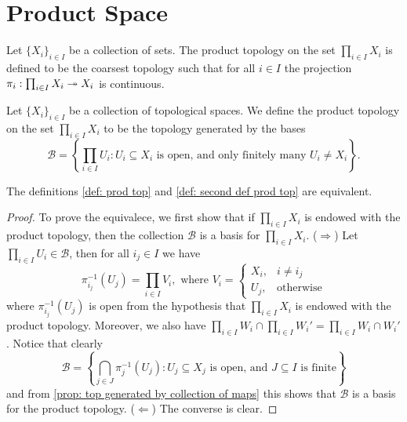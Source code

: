 \section{Product Space}

\begin{definition}
  \label{def: prod top}
  Let \(\{X_i\}_{i \in I}\) be a collection of sets. The product topology on the
  set \(\prod_{i \in I} X_i\) is defined to be the coarsest topology such that
  for all \(i \in I\) the projection \(\pi_i : \prod_{i \in I} X_i \twoheadrightarrow X_i\) is
  continuous.
\end{definition}

\begin{definition}
  \label{def: second def prod top}
  Let \(\{X_i\}_{i \in I}\) be a collection of topological spaces. We
  define the product topology on the set \(\prod_{i \in I} X_i\) to be the
  topology generated by the bases
  \[
    \mathcal B = \left\{ \prod_{i \in I} U_i : U_i \subseteq X_i
    \text{ is open, and only finitely many } U_i \neq X_i \right\}.
  \]
\end{definition}

\begin{corollary}\label{cor: equivalent defs prod top}
  The definitions \ref{def: prod top} and \ref{def: second def prod top}
  are equivalent.
\end{corollary}

\begin{proof}
  To prove the equivalece, we first show that if \(\prod_{i \in I} X_i\) is
  endowed with the product topology, then the collection \(\mathcal B\) is a
  basis for \(\prod_{i \in I} X_i\). (\(\Rightarrow\)) Let \(\prod_{i \in I} U_i
  \in \mathcal B\), then for all \(i_j \in I\) we have
  \[
    \pi_{i_j}^{-1}(U_j) = \prod_{i \in I} V_i, \text{ where } V_i =
    \begin{cases}
      X_i, &i \neq i_j \\
      U_j, &\text{otherwise}
    \end{cases}
  \]
  where \(\pi_{i_j}^{-1}(U_j)\) is open from the hypothesis that \(\prod_{i
  \in I} X_i\) is endowed with the product topology. Moreover, we also have
  \(\prod_{i \in I} W_i \cap \prod_{i \in I} W_i' = \prod_{i \in I} W_i \cap
  W_i'\). Notice that clearly
  \[
    \mathcal B = \left\{ \bigcap_{j \in J} \pi_j^{-1}(U_j) : U_j \subseteq X_j
    \text{ is open, and } J \subseteq I \text{ is finite}\right\}
  \]
  and from \cref{prop: top generated by collection of maps} this shows that
  \(\mathcal B\) is a basis for the product topology. (\(\Leftarrow\)) The
  converse is clear.
\end{proof}

